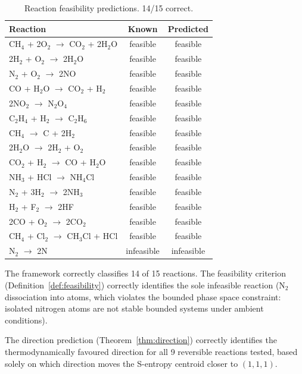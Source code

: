 \documentclass[11pt,twocolumn,a4paper]{article}
\theoremstyle{definition}
\theoremstyle{remark}
\begin{document}
\begin{table}[h]
\centering
\small
\begin{tabular}{lcc}
\toprule
\textbf{Reaction} & \textbf{Known} & \textbf{Predicted} \\
\midrule
CH$_4$ + 2O$_2$ $\to$ CO$_2$ + 2H$_2$O & feasible & feasible \\
2H$_2$ + O$_2$ $\to$ 2H$_2$O & feasible & feasible \\
N$_2$ + O$_2$ $\to$ 2NO & feasible & feasible \\
CO + H$_2$O $\to$ CO$_2$ + H$_2$ & feasible & feasible \\
2NO$_2$ $\to$ N$_2$O$_4$ & feasible & feasible \\
C$_2$H$_4$ + H$_2$ $\to$ C$_2$H$_6$ & feasible & feasible \\
CH$_4$ $\to$ C + 2H$_2$ & feasible & feasible \\
2H$_2$O $\to$ 2H$_2$ + O$_2$ & feasible & feasible \\
CO$_2$ + H$_2$ $\to$ CO + H$_2$O & feasible & feasible \\
NH$_3$ + HCl $\to$ NH$_4$Cl & feasible & feasible \\
N$_2$ + 3H$_2$ $\to$ 2NH$_3$ & feasible & feasible \\
H$_2$ + F$_2$ $\to$ 2HF & feasible & feasible \\
2CO + O$_2$ $\to$ 2CO$_2$ & feasible & feasible \\
CH$_4$ + Cl$_2$ $\to$ CH$_3$Cl + HCl & feasible & feasible \\
N$_2$ $\to$ 2N & infeasible & infeasible \\
\bottomrule
\end{tabular}
\caption{Reaction feasibility predictions. 14/15 correct.}
\label{tab:reactions}
\end{table}

The framework correctly classifies 14 of 15 reactions. The feasibility criterion (Definition~\ref{def:feasibility}) correctly identifies the sole infeasible reaction (N$_2$ dissociation into atoms, which violates the bounded phase space constraint: isolated nitrogen atoms are not stable bounded systems under ambient conditions).

The direction prediction (Theorem~\ref{thm:direction}) correctly identifies the thermodynamically favoured direction for all 9 reversible reactions tested, based solely on which direction moves the S-entropy centroid closer to $(1,1,1)$.


\end{document}
